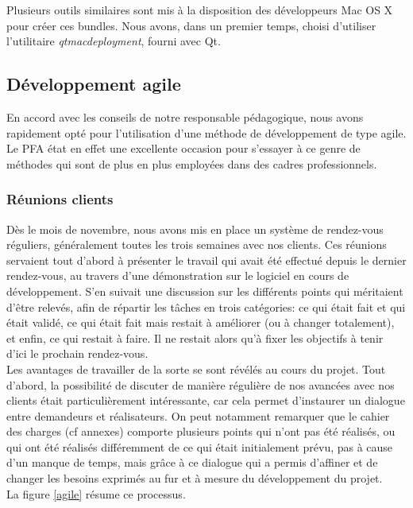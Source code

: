 \documentclass[a4paper,11pt]{article}
\begin{document}
Plusieurs outils similaires sont mis à la disposition des développeurs Mac OS X pour créer ces bundles. Nous avons, dans un premier temps, choisi d'utiliser l'utilitaire \textit{qtmacdeployment}, fourni avec Qt.

\subsection{Développement agile}

En accord avec les conseils de notre responsable pédagogique, nous avons rapidement opté pour l'utilisation d'une méthode de développement de type agile. Le PFA état en effet une excellente occasion pour s'essayer à ce genre de méthodes qui sont de plus en plus employées dans des cadres professionnels. 

\subsubsection{Réunions clients}

Dès le mois de novembre, nous avons mis en place un système de rendez-vous réguliers, généralement toutes les trois semaines avec nos clients. Ces réunions servaient tout d'abord à présenter le travail qui avait été effectué depuis le dernier rendez-vous, au travers d'une démonstration sur le logiciel en cours de développement. S'en suivait une discussion sur les différents points qui méritaient d'être relevés, afin de répartir les tâches en trois catégories: ce qui était fait et qui était validé, ce qui était fait mais restait à améliorer (ou à changer totalement), et enfin, ce qui restait à faire. Il ne restait alors qu'à fixer les objectifs à tenir d'ici le prochain rendez-vous.\\

Les avantages de travailler de la sorte se sont révélés au cours du projet. Tout d'abord, la possibilité de discuter de manière régulière de nos avancées avec nos clients était particulièrement intéressante, car cela permet d'instaurer un dialogue entre demandeurs et réalisateurs. On peut notamment remarquer que le cahier des charges (cf annexes) comporte plusieurs points qui n'ont pas été réalisés, ou qui ont été réalisés différemment de ce qui était initialement prévu, pas à cause d'un manque de temps, mais grâce à ce dialogue qui a permis d'affiner et de changer les besoins exprimés au fur et à mesure du développement du projet.\\

La figure \ref{agile} résume ce processus.
\end{document}
